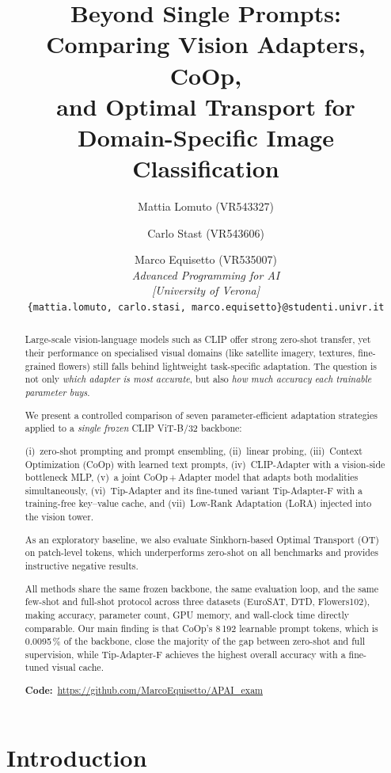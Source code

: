 \documentclass[10pt,twocolumn,letterpaper]{article}
\title{Beyond Single Prompts: Comparing Vision Adapters, CoOp,\\
and Optimal Transport for Domain-Specific Image Classification}
\author{
  Mattia Lomuto (VR543327)
  \and Carlo Stast (VR543606)
  \and Marco Equisetto (VR535007)
  \\[4pt]
  \textit{Advanced Programming for AI}\\
  \textit{[University of Verona]}\\
  {\small\texttt{\{mattia.lomuto, carlo.stasi, marco.equisetto\}@studenti.univr.it}}
}
\begin{document}
\maketitle

\begin{abstract}

Large-scale vision-language models such as CLIP offer strong zero-shot transfer, yet their performance on specialised visual domains (like satellite imagery, textures, fine-grained flowers) still falls behind lightweight task-specific adaptation.  The question is not only \emph{which adapter is most accurate}, but also \emph{how much accuracy each trainable parameter buys}.

We present a controlled comparison of seven parameter-efficient adaptation strategies applied to a \emph{single frozen} CLIP ViT-B/32 backbone:

(i)~zero-shot prompting and prompt ensembling,
(ii)~linear probing,
(iii)~Context Optimization (CoOp) with learned text prompts,
(iv)~CLIP-Adapter with a vision-side bottleneck MLP,
(v)~a joint CoOp\,+\,Adapter model that adapts both modalities simultaneously,
(vi)~Tip-Adapter and its fine-tuned variant Tip-Adapter-F with a training-free
key--value cache, and
(vii)~Low-Rank Adaptation (LoRA) injected into the vision tower.

As an exploratory baseline, we also evaluate Sinkhorn-based Optimal Transport (OT) on patch-level tokens, which underperforms zero-shot on all benchmarks and provides instructive negative results.

All methods share the same frozen backbone, the same evaluation loop, and the same few-shot and full-shot protocol across three datasets (EuroSAT, DTD, Flowers102), making accuracy, parameter count, GPU memory, and wall-clock time directly comparable. Our main finding is that CoOp's 8\,192 learnable prompt tokens, which is 0.0095\,\% of the backbone, close the majority of the gap between zero-shot and full supervision, while Tip-Adapter-F achieves the highest overall accuracy
with a fine-tuned visual cache.

\smallskip\noindent\textbf{Code:}~\url{https://github.com/MarcoEquisetto/APAI_exam}
\end{abstract}


\section{Introduction}\label{sec:introduction}
\end{document}
